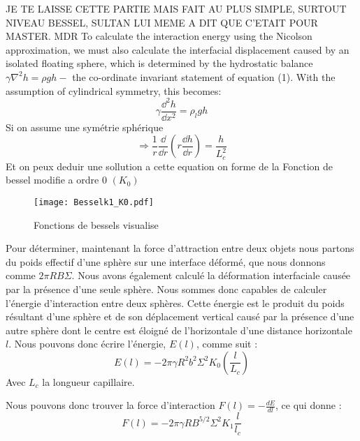     JE TE LAISSE CETTE PARTIE MAIS FAIT AU PLUS SIMPLE, SURTOUT NIVEAU BESSEL, SULTAN LUI MEME A DIT QUE C'ETAIT POUR MASTER. MDR 
    To calculate the interaction energy using the Nicolson approximation, we must also calculate the interfacial displacement caused by an isolated floating sphere, which is determined by the hydrostatic balance \(\gamma\nabla^2h = \rho gh -\) the co-ordinate invariant statement of equation (1). With the assumption of cylindrical symmetry, this becomes:
    \begin{equation}
        \gamma \frac{\dd^2h}{\dd x^2} = \rho_l g h
    \end{equation}
    Si on assume une symétrie sphérique
    \begin{equation}
        \Rightarrow \frac{1}{r} \frac{\dd}{\dd r} \left( r\frac{\dd h}{\dd r}\right) = \frac{h}{L_c^2}
    \end{equation}
    Et on peux deduir une sollution a cette equation on forme de la Fonction de bessel modifie a ordre 0 $(K_0)$\cite{introtoBessel}

    \begin{figure}[H]
        \centering
        \texttt{[image: Besselk1\_K0.pdf]}
        \caption{Fonctions de bessels visualise}
    \end{figure}

    Pour déterminer, maintenant la force d'attraction entre deux objets nous partons du poids effectif d'une sphère sur une interface déformé, que nous donnons comme \(2\pi RB\Sigma\). Nous avons également calculé la déformation interfaciale causée
    par la présence d'une seule sphère. Nous sommes donc capables de calculer l'énergie d'interaction entre deux sphères. Cette énergie est le produit du poids résultant d'une sphère et de son déplacement vertical causé par la présence d'une autre sphère dont le centre est éloigné de l'horizontale d'une distance horizontale $l$. Nous pouvons donc écrire l'énergie, $E(l)$, comme suit :
    \begin{equation}
        E(l)=-2\pi\gamma R^2b^2\Sigma^2K_0\left(\frac{l}{L_c}\right)
        \label{eq:energyInteraction}
    \end{equation}
    Avec $L_c$ la longueur capillaire.

    Nous pouvons donc trouver la force d'interaction $F(l)=-\frac{dE}{dl}$, ce qui donne :
    \begin{equation}
        \boxed{
            F(l)=-2\pi\gamma RB^{5/2}\Sigma^2K_1\frac{l}{l_c}
        }
        \label{eq:ForceInteraction}
    \end{equation}


